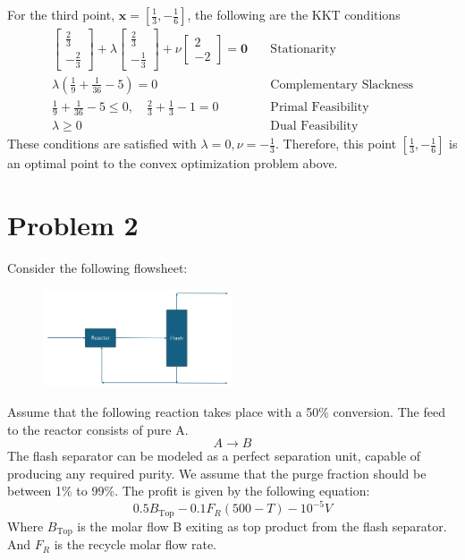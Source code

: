 \documentclass[11pt]{article}
\begin{document}
For the third point, $\textbf{x} = [\frac{1}{3}, -\frac{1}{6}]$, the following are the KKT conditions
\begin{align*}
  \begin{bmatrix}
    \frac{2}{3} \\ -\frac{2}{3}
  \end{bmatrix}
  +
  \lambda
  \begin{bmatrix}
    \frac{2}{3} \\ -\frac{1}{3}
  \end{bmatrix}
  +
  \nu
  \begin{bmatrix}
    2 \\ -2
  \end{bmatrix}
  = \textbf{0}
  & \quad \text{Stationarity} \\
  \lambda (\frac{1}{9} + \frac{1}{36} - 5) = 0 
  & \quad \text{Complementary Slackness} \\
  \frac{1}{9} + \frac{1}{36} - 5 \leq 0, \quad \frac{2}{3} + \frac{1}{3} - 1 = 0
  & \quad \text{Primal Feasibility} \\
  \lambda \geq 0 
  & \quad \text{Dual Feasibility}
\end{align*}
These conditions are satisfied with $\lambda=0, \nu=-\frac{1}{3}$.
Therefore, this point $[\frac{1}{3}, -\frac{1}{6}]$ is an optimal point to the convex optimization problem above.


\section{Problem 2}
Consider the following flowsheet:

\begin{figure}[htbp]
  \centerline{\includegraphics[width=0.5\textwidth]{images/flowsheet.png}}
  \label{fig:flowsheet}
\end{figure}

Assume that the following reaction takes place with a 50\% conversion. The feed to
the reactor consists of pure A.
\[ A \rightarrow B \]
The flash separator can be modeled as a perfect separation unit, capable of
producing any required purity.
We assume that the purge fraction should be between 1\% to 99\%.
The profit is given by the following equation:
\[ 0.5B_{\text{Top}} - 0.1F_R(500 - T) - 10^{-5}V \]
Where $B_{\text{Top}}$ is the molar flow B exiting as top product from the flash separator. 
And $F_R$ is the recycle molar flow rate.
\end{document}
